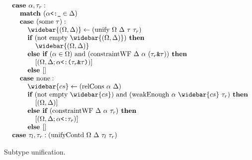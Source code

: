 \documentclass[acmsmall]{acmart}
\begin{document}
\begin{figure*}[h]
\[\begin{array}[t]{@{} l}
    \I \B{case } \alpha, \tau_r : 
    \\
    \I\I \B{match } (\code{$\alpha$<:\_} \in \Delta)
    \\
    \I\I \B{case } (\F{some } \tau) :
    \\
    \I\I\I \widebar{(\Omega, \Delta)} \leftarrow (\F{unify } \Omega\ \Delta\ \tau\ \tau_r)
    \\
    \I\I\I \B{if } (\F{not } \F{empty } \widebar{(\Omega, \Delta)}) \B{ then }
    \\
    \I\I\I\I \widebar{(\Omega, \Delta)}
    \\
    \I\I\I \B{else if } (\alpha \in \Omega) \F{ and } (\F{constraintWF } \Delta\ \alpha\ (\code{$\tau_r$\&$\tau$})) \B{ then }
    \\
    \I\I\I\I [(\Omega, \Delta;\code{$\alpha$<:($\tau_r$\&$\tau$)})]
    \\
    \I\I\I \B{else } [] 
    \\
    \I\I \B{case } \F{none} :
    \\
    \I\I\I \widebar{cs} \leftarrow (\F{relCons } \alpha\ \Delta)  
    \\
    \I\I\I \B{if } (\F{not } \F{empty } \widebar{cs}) \F{ and } 
    (\F{weakEnough } \alpha\ \widebar{cs}\ \tau_r) \B{ then }
    \\
    \I\I\I\I [(\Omega, \Delta)]
    \\
    \I\I\I \B{else if } (\F{constraintWF } \Delta\ \alpha\ \tau_r) \B{ then }
    \\
    \I\I\I\I [(\Omega, \Delta;\code{$\alpha$<:$\tau_r$})] 
    \\
    \I\I\I \B{else } []

    \\

    \I \B{case } \tau_l, \tau_r : (\text{unifyContd } \Omega\ \Delta\ \tau_l\ \tau_r)


\end{array}
\]

\caption{Subtype unification.}
\end{figure*}
\end{document}
